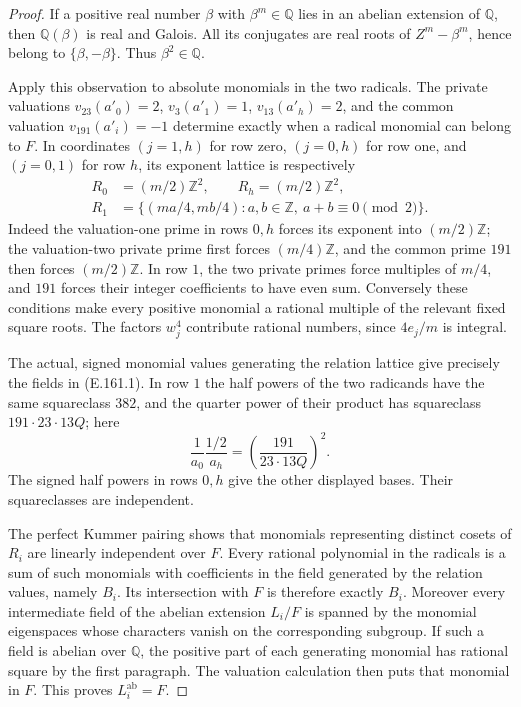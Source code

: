 \begin{proof}
If a positive real number $\beta$ with $\beta^m\in\mathbb Q$
lies in an abelian extension of $\mathbb Q$, then
$\mathbb Q(\beta)$ is real and Galois.  All its conjugates are
real roots of $Z^m-\beta^m$, hence belong to $\{\beta,-\beta\}$.
Thus $\beta^2\in\mathbb Q$.

Apply this observation to absolute monomials in the two radicals.
The private valuations $v_{23}(a'_0)=2$,
$v_3(a'_1)=1$, $v_{13}(a'_h)=2$, and the common valuation
$v_{191}(a'_i)=-1$ determine exactly when a radical monomial
can belong to $F$.  In coordinates $(j=1,h)$ for row zero,
$(j=0,h)$ for row one, and $(j=0,1)$ for row $h$, its exponent
lattice is respectively
\[
\begin{split}
 R_0&=(m/2)\mathbb Z^2,\qquad R_h=(m/2)\mathbb Z^2,\\
 R_1&=\{(ma/4,mb/4):a,b\in\mathbb Z,\ a+b\equiv0\pmod2\}.
\end{split}
\tag{E.161.2}
\]
Indeed the valuation-one prime in rows $0,h$ forces its
exponent into $(m/2)\mathbb Z$; the valuation-two private prime
first forces $(m/4)\mathbb Z$, and the common prime $191$
then forces $(m/2)\mathbb Z$.  In row $1$, the two private
primes force multiples of $m/4$, and $191$ forces their
integer coefficients to have even sum.  Conversely these
conditions make every positive monomial a rational multiple
of the relevant fixed square roots.  The factors $w_j^4$
contribute rational numbers, since $4e_j/m$ is integral.

The actual, signed monomial values generating the relation
lattice give precisely the fields in (E.161.1).  In row $1$
the half powers of the two radicands have the same squareclass
$382$, and the quarter power of their product has squareclass
$191\cdot23\cdot13Q$; here
\[
 \frac{1}{a_0}\frac{1/2}{a_h}
       =\left(\frac{191}{23\cdot13Q}\right)^2.
\]
The signed half powers in rows $0,h$ give the other displayed
bases.  Their squareclasses are independent.

The perfect Kummer pairing
\citep[Theorem 5.30 and Remark 5.32, pp.~75--76]{RootMilneFT}
shows that monomials representing distinct cosets of $R_i$
are linearly independent over $F$.  Every rational polynomial
in the radicals is a sum of such monomials with coefficients
in the field generated by the relation values, namely $B_i$.
Its intersection with $F$ is therefore exactly $B_i$.
Moreover every intermediate field of the abelian extension
$L_i/F$ is spanned by the monomial eigenspaces whose characters
vanish on the corresponding subgroup.  If such a field is
abelian over $\mathbb Q$, the positive part of each generating
monomial has rational square by the first paragraph.  The
valuation calculation then puts that monomial in $F$.
This proves $L_i^{\mathrm{ab}}=F$.


\end{proof}
